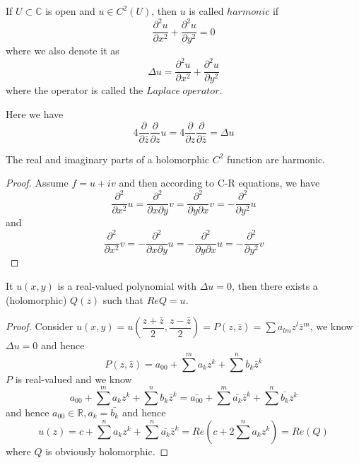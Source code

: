 \documentclass[lang=en, color=blue, ]{elegantbook}
\newcommand{\R}{\mathbb{R}}
\newcommand{\C}{\mathbb{C}}
\newcommand{\ParZ}{\dfrac{\partial}{\partial z}}
\newcommand{\ParbZ}{\dfrac{\partial}{\partial \bar{z}}}
\begin{document}
\begin{definition}
If $U\subset \C$ is open and $u\in C^2(U)$, then $u$ is called $harmonic$ if
\[\dfrac{\partial^2 u}{\partial x^2}+\dfrac{\partial^2 u}{\partial y^2} = 0\]
where we also denote it as
\[\Delta u = \dfrac{\partial^2 u}{\partial x^2}+\dfrac{\partial^2 u}{\partial y^2}\]
where the operator is called the $Laplace\ operator$.
\end{definition}
Here we have
\[4\ParbZ\ParZ u = 4 \ParZ\ParbZ = \Delta u\]

\begin{proposition}
    The real and imaginary parts of a holomorphic $C^2$ function are harmonic.
\end{proposition}
\begin{proof}\par
    Assume $f = u + iv$ and then according to C-R equations, we have
    \[\dfrac{\partial^2}{\partial x^2} u = \dfrac{\partial^2}{\partial x\partial y} v = \dfrac{\partial^2}{\partial y\partial x} v = -\dfrac{\partial^2}{\partial y^2} u
    \]
    and
    \[\dfrac{\partial^2}{\partial x^2} v = -\dfrac{\partial^2}{\partial x\partial y} u = -\dfrac{\partial^2}{\partial y\partial x} u = -\dfrac{\partial^2}{\partial y^2} v
    \]
\end{proof}

\begin{lemma}
It $u(x,y)$ is a real-valued polynomial with $\Delta u = 0$, then there exists a (holomorphic) $Q(z)$ such that $Re Q= u$.
\end{lemma}
\begin{proof}\par
    Consider $u(x,y) = u(\dfrac{z+\bar{z}}{2},\dfrac{z-\bar{z}}{2}) = P(z,\bar{z}) = \sum a_{lm}z^l\bar{z}^m$, we know $\Delta u = 0$ and hence
    \[P(z,\bar{z}) = a_00 + \sum^m a_k z^k + \sum^n b_k \bar{z}^k\]
    $P$ is real-valued and we know
    \[a_00 + \sum^m a_k z^k + \sum^n b_k \bar{z}^k = \bar{a_00} + \sum^m \bar{a_k} \bar{z}^k + \sum^n \bar{b_k} z^k\]
    and hence $a_00\in \R, a_k = \bar{b_k}$ and hence
    \[
    u(z) = c + \sum^n a_{k}z^k + \sum^n \bar{a_{k}}\bar{z}^k = Re(c+2\sum^n a_k z^k) = Re(Q)
    \]
    where $Q$ is obviously holomorphic.
\end{proof}
\end{document}

